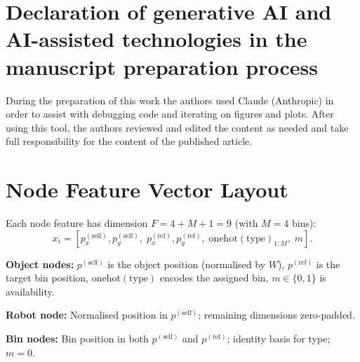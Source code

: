 \documentclass[review,times]{elsarticle}
\begin{document}
\section*{Declaration of generative AI and AI-assisted technologies in the manuscript preparation process}
During the preparation of this work the authors used Claude (Anthropic) in order to assist with debugging code and iterating on figures and plots. After using this tool, the authors reviewed and edited the content as needed and take full responsibility for the content of the published article.

\appendix
\section{Node Feature Vector Layout}\label{app:features}

Each node feature has dimension $F = 4 + M + 1 = 9$ (with $M{=}4$ bins):
\begin{equation}
x_i = [p^{(\text{self})}_x, p^{(\text{self})}_y,\; p^{(\text{ref})}_x, p^{(\text{ref})}_y,\; \text{onehot}(\text{type})_{1:M},\; m].
\end{equation}

\textbf{Object nodes:} $p^{(\text{self})}$ is the object position (normalised by $W$), $p^{(\text{ref})}$ is the target bin position, $\text{onehot}(\text{type})$ encodes the assigned bin, $m \in \{0,1\}$ is availability.

\textbf{Robot node:} Normalised position in $p^{(\text{self})}$; remaining dimensions zero-padded.

\textbf{Bin nodes:} Bin position in both $p^{(\text{self})}$ and $p^{(\text{ref})}$; identity basis for type; $m{=}0$.



\end{document}
